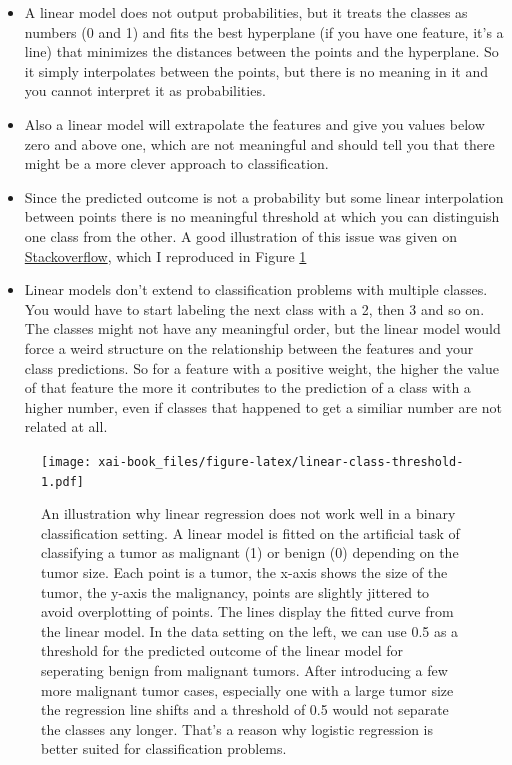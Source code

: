 \documentclass[12pt,]{krantz}
\providecommand{\tightlist}{%
  \setlength{\itemsep}{0pt}\setlength{\parskip}{0pt}}
\theoremstyle{definition}
\theoremstyle{definition}
\theoremstyle{definition}
\theoremstyle{remark}
\begin{document}
\begin{itemize}
\tightlist
\item
  A linear model does not output probabilities, but it treats the
  classes as numbers (0 and 1) and fits the best hyperplane (if you have
  one feature, it's a line) that minimizes the distances between the
  points and the hyperplane. So it simply interpolates between the
  points, but there is no meaning in it and you cannot interpret it as
  probabilities.
\item
  Also a linear model will extrapolate the features and give you values
  below zero and above one, which are not meaningful and should tell you
  that there might be a more clever approach to classification.
\item
  Since the predicted outcome is not a probability but some linear
  interpolation between points there is no meaningful threshold at which
  you can distinguish one class from the other. A good illustration of
  this issue was given on
  \href{https://stats.stackexchange.com/questions/22381/why-not-approach-classification-through-regression}{Stackoverflow},
  which I reproduced in Figure \ref{fig:linear-class-threshold}
\item
  Linear models don't extend to classification problems with multiple
  classes. You would have to start labeling the next class with a 2,
  then 3 and so on. The classes might not have any meaningful order, but
  the linear model would force a weird structure on the relationship
  between the features and your class predictions. So for a feature with
  a positive weight, the higher the value of that feature the more it
  contributes to the prediction of a class with a higher number, even if
  classes that happened to get a similiar number are not related at all.
\end{itemize}

\begin{figure}
\centering
\texttt{[image: xai-book\_files/figure-latex/linear-class-threshold-1.pdf]}
\caption{\label{fig:linear-class-threshold}An illustration why linear
regression does not work well in a binary classification setting. A
linear model is fitted on the artificial task of classifying a tumor as
malignant (1) or benign (0) depending on the tumor size. Each point is a
tumor, the x-axis shows the size of the tumor, the y-axis the
malignancy, points are slightly jittered to avoid overplotting of
points. The lines display the fitted curve from the linear model. In the
data setting on the left, we can use 0.5 as a threshold for the
predicted outcome of the linear model for seperating benign from
malignant tumors. After introducing a few more malignant tumor cases,
especially one with a large tumor size the regression line shifts and a
threshold of 0.5 would not separate the classes any longer. That's a
reason why logistic regression is better suited for classification
problems.}
\end{figure}
\end{document}
